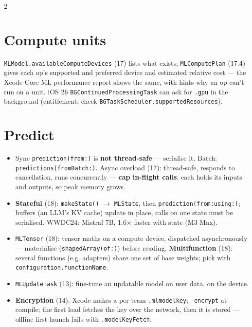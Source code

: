 \documentclass[8pt]{extarticle}
\newcommand\ct[1]{\texttt{#1}}
\begin{document}
\begin{multicols}{2}
\section{Compute units}
\par
\ct{MLModel.availableComputeDevices} (17) lists what exists; \ct{MLComputePlan} (17.4) gives each
op's supported and preferred device and estimated relative cost — the Xcode Core ML performance
report shows the same, with hints why an op can't run on a unit. iOS 26
\ct{BGContinuedProcessingTask} can ask for \ct{.gpu} in the background (entitlement; check
\ct{BGTaskScheduler.supportedResources}).

\section{Predict}
\begin{itemize}
  \item Sync \ct{prediction(from:)} is \textbf{not thread-safe} — serialise it. Batch:
        \ct{predictions(fromBatch:)}. Async overload (17): thread-safe, responds to
        cancellation, runs concurrently — \textbf{cap in-flight calls}: each holds its inputs and
        outputs, so peak memory grows.
  \item \textbf{Stateful} (18): \ct{makeState()} $\to$ \ct{MLState}, then
        \ct{prediction(from:using:)}; buffers (an LLM's KV cache) update in place, calls on one
        state must be serialised. WWDC24: Mistral 7B, 1.6$\times$ faster with state (M3 Max).
  \item \ct{MLTensor} (18): tensor maths on a compute device, dispatched asynchronously —
        materialise (\ct{shapedArray(of:)}) before reading. \textbf{Multifunction} (18): several
        functions (e.g. adapters) share one set of base weights; pick with
        \ct{configuration.functionName}.
  \item \ct{MLUpdateTask} (13): fine-tune an updatable model on user data, on the device.
  \item \textbf{Encryption} (14): Xcode makes a per-team \ct{.mlmodelkey}; \ct{--encrypt} at
        compile; the first load fetches the key over the network, then it is stored — offline
        first launch fails with \ct{.modelKeyFetch}.
\end{itemize}


\end{multicols}
\end{document}
